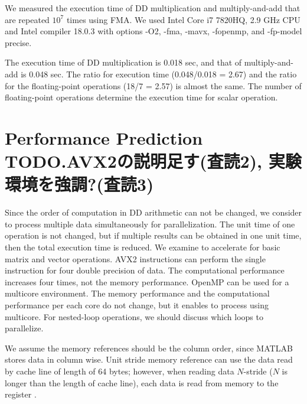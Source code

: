 \documentclass{IOS-Book-Article}
\begin{document}
We measured the execution time of DD multiplication and multiply-and-add that are repeated $10^7$ times using FMA.
We used Intel Core i7 7820HQ, 2.9 GHz CPU and Intel compiler 18.0.3 with options -O2, -fma, -mavx, -fopenmp, and -fp-model precise. 

The execution time of DD multiplication is 0.018 sec, and that of multiply-and-add is 0.048 sec. The ratio for execution time (0.048/0.018 = 2.67) and the ratio for the floating-point operations (18/7 = 2.57) is almost the same. The number of floating-point operations determine the execution time for scalar operation.

\section{Performance Prediction TODO.AVX2の説明足す(査読2), 実験環境を強調?(査読3)}
Since the order of computation in DD arithmetic can not be changed, we consider to process multiple data simultaneously for parallelization.
The unit time of one operation is not changed, but if multiple results can be obtained in one unit time, then the total execution time is reduced.
We examine to accelerate for basic matrix and vector operations.
AVX2 instructions \cite{SIMD} can perform the single instruction for four double precision of data. The computational performance increases four times, not the memory performance.
OpenMP \cite{omp} can be used for a multicore environment. The memory performance and the computational performance per each core do not change, but it enables to process using multicore. For nested-loop operations, we should discuss which loops to parallelize. 

We assume the memory references should be the column order, since MATLAB stores data in column wise. Unit stride memory reference can use the data read by cache line of length of 64 bytes; however, when reading data $N$-stride ($N$ is longer than the length of cache line), each data is read from memory to the register \cite{HPC}. 
\end{document}
